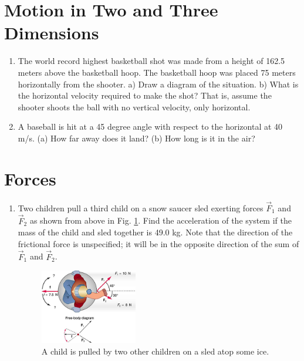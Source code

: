 \documentclass[10pt]{article}
\begin{document}
\section{Motion in Two and Three Dimensions}

\begin{enumerate}
\item The world record highest basketball shot was made from a height of 162.5 meters above the basketball hoop.  The basketball hoop was placed 75 meters horizontally from the shooter.  a) Draw a diagram of the situation.  b) What is the horizontal velocity required to make the shot?  That is, assume the shooter shoots the ball with no vertical velocity, only horizontal. \\ \vspace{4cm}
\item A baseball is hit at a 45 degree angle with respect to the horizontal at 40 m/s.  (a) How far away does it land? (b) How long is it in the air? \\ \vspace{1cm}
\end{enumerate}

\section{Forces}

\begin{enumerate}
\item Two children pull a third child on a snow saucer sled exerting forces $\vec{F}_1$ and $\vec{F}_2$ as shown from above in Fig. \ref{fig:1}.  Find the acceleration of the system if the mass of the child and sled together is 49.0 kg. Note that the direction of the frictional force is unspecified; it will be in the opposite direction of the sum of $\vec{F}_1$ and $\vec{F}_2$.

\begin{figure}[hb]
\centering
\includegraphics[width=0.4\textwidth]{child.jpeg}
\caption{\label{fig:1} A child is pulled by two other children on a sled atop some ice.}
\end{figure}
\end{enumerate}
\end{document}
